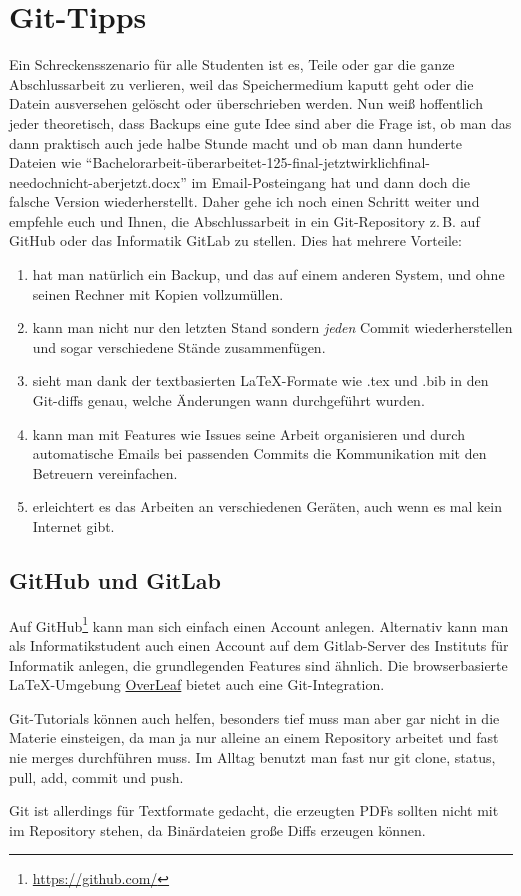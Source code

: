 \chapter{Git-Tipps}
Ein Schreckensszenario für alle Studenten ist es, Teile oder gar die ganze Abschlussarbeit zu verlieren, weil das Speichermedium kaputt geht oder die Datein ausversehen gelöscht oder überschrieben werden.
Nun weiß hoffentlich jeder theoretisch, dass Backups eine gute Idee sind aber die Frage ist, ob man das dann praktisch auch jede halbe Stunde macht und ob man dann hunderte Dateien wie \enquote{Bachelorarbeit-überarbeitet-125-final-jetztwirklichfinal-needochnicht-aberjetzt.docx} im Email-Posteingang hat und dann doch die falsche Version wiederherstellt.
Daher gehe ich noch einen Schritt weiter und empfehle euch und Ihnen, die Abschlussarbeit in ein Git-Repository z.\,B. auf GitHub oder das Informatik GitLab zu stellen.
Dies hat mehrere Vorteile:

\begin{enumerate}
\item hat man natürlich ein Backup, und das auf einem anderen System, und ohne seinen Rechner mit Kopien vollzumüllen.
\item kann man nicht nur den letzten Stand sondern \emph{jeden} Commit wiederherstellen und sogar verschiedene Stände zusammenfügen.
\item sieht man dank der textbasierten LaTeX-Formate wie .tex und .bib in den Git-diffs genau, welche Änderungen wann durchgeführt wurden.
\item kann man mit Features wie Issues seine Arbeit organisieren und durch automatische Emails bei passenden Commits die Kommunikation mit den Betreuern vereinfachen.
\item erleichtert es das Arbeiten an verschiedenen Geräten, auch wenn es mal kein Internet gibt.
\end{enumerate}

\section{GitHub und GitLab}
Auf GitHub\footnote{\url{https://github.com/}} kann man sich einfach einen Account anlegen.
Alternativ kann man als Informatikstudent auch einen Account auf dem Gitlab-Server des Instituts für Informatik\footnotemark{} anlegen, die grundlegenden Features sind ähnlich.
Die browserbasierte LaTeX-Umgebung \href{https://www.overleaf.com/}{OverLeaf} bietet auch eine Git-Integration.

Git-Tutorials\footnotemark{} können auch helfen, besonders tief muss man aber gar nicht in die Materie einsteigen, da man ja nur alleine an einem Repository arbeitet und fast nie merges durchführen muss.
Im Alltag benutzt man fast nur git clone, status, pull, add, commit und push.

Git ist allerdings für Textformate gedacht, die erzeugten PDFs sollten nicht mit im Repository stehen, da Binärdateien große Diffs erzeugen können.
